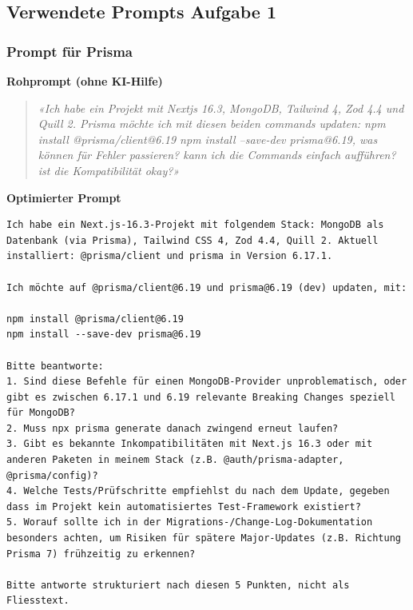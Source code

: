 \documentclass[11pt,a4paper]{article}
\newcommand{\minihead}[1]{\par\needspace{5\baselineskip}\noindent\textbf{#1}\par\nobreak}
\let\oldsubsection\subsection
\renewcommand{\subsection}{\needspace{6\baselineskip}\oldsubsection}
\let\oldsubsubsection\subsubsection
\renewcommand{\subsubsection}{\needspace{6\baselineskip}\oldsubsubsection}
\begin{document}
\subsection{Verwendete Prompts Aufgabe 1}
\label{app:prompts1}

\subsubsection{Prompt für Prisma}
\minihead{Rohprompt (ohne KI-Hilfe)}
\begin{quote}
\textit{«Ich habe ein Projekt mit Nextjs 16.3, MongoDB, Tailwind 4, Zod 4.4 und Quill 2. Prisma möchte ich mit diesen beiden commands updaten: npm install @prisma/client@6.19 npm install --save-dev prisma@6.19, was können für Fehler passieren? kann ich die Commands einfach aufführen? ist die Kompatibilität okay?»}
\end{quote}

\minihead{Optimierter Prompt}
\begin{lstlisting}
Ich habe ein Next.js-16.3-Projekt mit folgendem Stack: MongoDB als Datenbank (via Prisma), Tailwind CSS 4, Zod 4.4, Quill 2. Aktuell installiert: @prisma/client und prisma in Version 6.17.1.

Ich möchte auf @prisma/client@6.19 und prisma@6.19 (dev) updaten, mit:

npm install @prisma/client@6.19
npm install --save-dev prisma@6.19

Bitte beantworte:
1. Sind diese Befehle für einen MongoDB-Provider unproblematisch, oder gibt es zwischen 6.17.1 und 6.19 relevante Breaking Changes speziell für MongoDB?
2. Muss npx prisma generate danach zwingend erneut laufen?
3. Gibt es bekannte Inkompatibilitäten mit Next.js 16.3 oder mit anderen Paketen in meinem Stack (z.B. @auth/prisma-adapter, @prisma/config)?
4. Welche Tests/Prüfschritte empfiehlst du nach dem Update, gegeben dass im Projekt kein automatisiertes Test-Framework existiert?
5. Worauf sollte ich in der Migrations-/Change-Log-Dokumentation besonders achten, um Risiken für spätere Major-Updates (z.B. Richtung Prisma 7) frühzeitig zu erkennen?

Bitte antworte strukturiert nach diesen 5 Punkten, nicht als Fliesstext.
\end{lstlisting}
\end{document}
